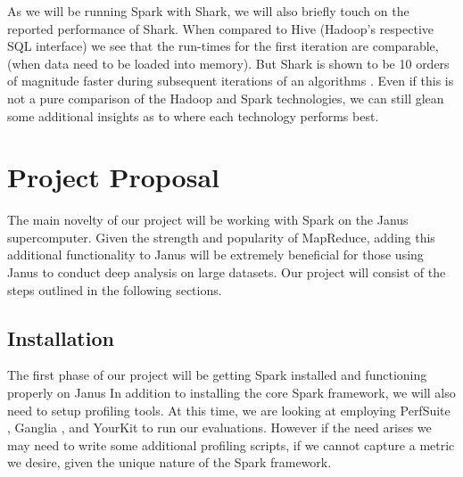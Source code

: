 \documentclass{article}
\begin{document}




As we will be running Spark with Shark, we will also briefly touch on the
reported performance of Shark. When compared to Hive (Hadoop's respective
SQL interface) we see that the run-times for the first iteration are comparable,
(when data need to be loaded into memory). But Shark is shown to be 10 orders
of magnitude faster during subsequent iterations of an algorithms \citep{engle}.
Even if this is not a pure comparison of the Hadoop and Spark technologies, we
can still glean some additional insights as to where each technology performs
best.


\section*{Project Proposal}
The main novelty of our project will be working with Spark on the Janus
supercomputer. Given the strength and popularity of MapReduce, adding this
additional functionality to Janus will be extremely beneficial for those using
Janus to conduct deep analysis on large datasets. Our project will consist of
the steps outlined in the following sections.

\subsection*{Installation}
The first phase of our project will be getting Spark installed and functioning
properly on Janus In addition to installing the core Spark framework, we will
also need to setup profiling tools. At this time, we are looking at employing
PerfSuite \citep{perfsuite}, Ganglia \citep{ganglia}, and YourKit
\citep{yourkit} to run our evaluations. However if the need arises we may
need to write some additional profiling scripts, if we cannot capture a metric
we desire, given the unique nature of the Spark framework.
\end{document}
